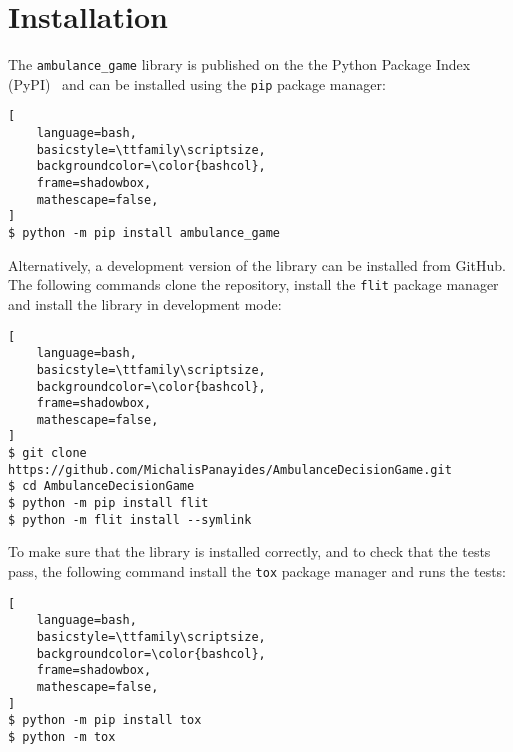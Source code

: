 \section{Installation}\label{sec:ambulance_game_installation}

The \texttt{ambulance\_game} library is published on the the Python Package
Index (PyPI)~\cite{pypi}
and can be installed using the \texttt{pip} package manager:

\begin{lstlisting}[
    language=bash,
    basicstyle=\ttfamily\scriptsize,
    backgroundcolor=\color{bashcol},
    frame=shadowbox,
    mathescape=false,
]
$ python -m pip install ambulance_game
\end{lstlisting}

Alternatively, a development version of the library can be installed from
GitHub.
The following commands clone the repository, install the \texttt{flit}
package manager and install the library in development mode: 

\begin{lstlisting}[
    language=bash,
    basicstyle=\ttfamily\scriptsize,
    backgroundcolor=\color{bashcol},
    frame=shadowbox,
    mathescape=false,
]
$ git clone https://github.com/MichalisPanayides/AmbulanceDecisionGame.git
$ cd AmbulanceDecisionGame
$ python -m pip install flit
$ python -m flit install --symlink
\end{lstlisting}

To make sure that the library is installed correctly, and to check that the
tests pass, the following command install the \texttt{tox} package manager
and runs the tests:

\begin{lstlisting}[
    language=bash,
    basicstyle=\ttfamily\scriptsize,
    backgroundcolor=\color{bashcol},
    frame=shadowbox,
    mathescape=false,
]
$ python -m pip install tox
$ python -m tox
\end{lstlisting}
